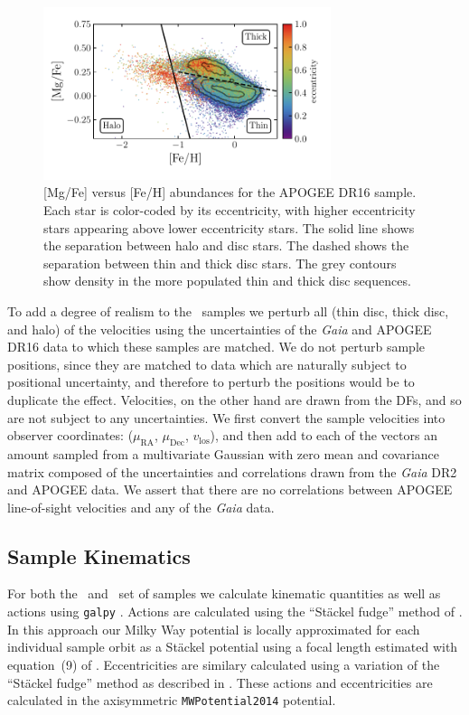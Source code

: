\begin{figure}
	\centering
	\includegraphics[width=0.75\textwidth]{figure/ch2/APOGEEDR16HaloDiscALPHAFE.pdf}
	\caption{[Mg/Fe] versus [Fe/H] abundances for the APOGEE DR16 sample. Each star is color-coded by its eccentricity, with higher eccentricity stars appearing above lower eccentricity stars. The solid line shows the separation between halo and disc stars. The dashed shows the separation between thin and thick disc stars. The grey contours show density in the more populated thin and thick disc sequences.}
	\label{ch2:fig:APOGEEAbundances}
\end{figure}

To add a degree of realism to the \survey\ samples we perturb all (thin disc, thick disc, and halo) of the velocities using the uncertainties of the \textit{Gaia} and APOGEE DR16 data to which these samples are matched. We do not perturb sample positions, since they are matched to data which are naturally subject to positional uncertainty, and therefore to perturb the positions would be to duplicate the effect. Velocities, on the other hand are drawn from the DFs, and so are not subject to any uncertainties. We first convert the sample velocities into observer coordinates: ($\mu_\mathrm{RA}$, $\mu_\mathrm{Dec}$, $v_\mathrm{los}$), and then add to each of the vectors an amount sampled from a multivariate Gaussian with zero mean and covariance matrix composed of the uncertainties and correlations drawn from the \textit{Gaia} DR2 and APOGEE data. We assert that there are no correlations between APOGEE line-of-sight velocities and any of the \textit{Gaia} data.

\subsection{Sample Kinematics}
\label{ch2:subsec:SampleKinematics}

For both the \solar\ and \survey\ set of samples we calculate kinematic quantities as well as actions using \texttt{galpy} \parencite{bovy15}. Actions are calculated using the ``St\"{a}ckel fudge'' method of \textcite{binney12}. In this approach our Milky Way potential is locally approximated for each individual sample orbit as a St\"{a}ckel potential using a focal length estimated with equation~(9) of \textcite{sanders12}. Eccentricities are similary calculated using a variation of the ``St\"{a}ckel fudge'' method as described in \textcite{mackereth18c}. These actions and eccentricities are calculated in the axisymmetric \texttt{MWPotential2014} potential. 

